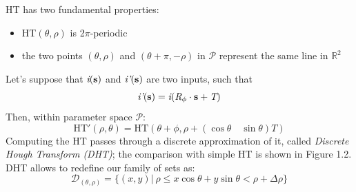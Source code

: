 \documentclass[a4paper, onecolumn]{report}
\begin{document}
HT has two fundamental properties:
\begin{itemize}
	\item{\mbox{HT}$(\theta, \rho)$ is 2$\pi$-periodic}
	\item{the two points $(\theta, \rho)$ and $(\theta+\pi, -\rho)$ in $\mathcal{P}$ represent the same line in $\mathbb{R}^2$}
\end{itemize}
Let's suppose that $\emph{i}(\bf{s})$ and $\emph{i'}(\bf{s})$ are two inputs, such that
\begin{equation}
	\emph{i'}(\bf{s}) = \emph{i}(\emph{R}_\phi \cdot \bf{s} + \emph{T})
\end{equation}
Then, within parameter space $\mathcal{P}$:
\begin{equation}
	\mbox{HT}'(\rho, \theta) = \mbox{HT}(\theta+\phi, \rho+(\cos\theta \quad \sin\theta)T)
\end{equation}
Computing the HT passes through a discrete approximation of it, called \emph{Discrete Hough Transform (DHT)}; the comparison with simple HT is shown in Figure 1.2. DHT allows to redefine our family of sets as:
\begin{equation}
	\mathcal{D}_{(\theta, \rho)} = \{(x,y) | \ \rho\le x\cos\theta + y\sin\theta < \rho + \Delta\rho\} 
\end{equation}
\end{document}
